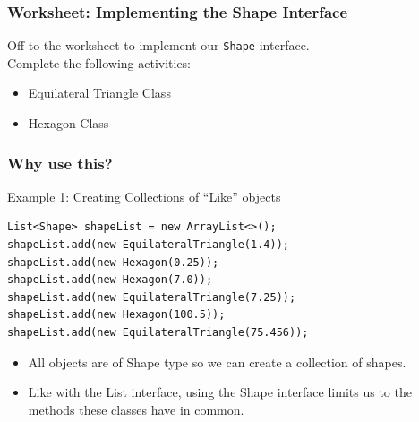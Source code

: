 \documentclass{beamer}
\begin{document}
\begin{frame}
    \frametitle{Worksheet: Implementing the Shape Interface}
    \begin{figure}
        \centering
        \hspace{2.5cm}
    \end{figure}
    Off to the worksheet to implement our \lstinline|Shape| interface.\\
    Complete the following activities:
    \begin{itemize}
        \item Equilateral Triangle Class
        \item Hexagon Class
    \end{itemize}
\end{frame}

\begin{frame}[fragile]
    \frametitle{Why use this?}
    Example 1: Creating Collections of ``Like'' objects
    \vfill
    \begin{lstlisting}
List<Shape> shapeList = new ArrayList<>();
shapeList.add(new EquilateralTriangle(1.4));
shapeList.add(new Hexagon(0.25));
shapeList.add(new Hexagon(7.0));
shapeList.add(new EquilateralTriangle(7.25));
shapeList.add(new Hexagon(100.5));
shapeList.add(new EquilateralTriangle(75.456));
    \end{lstlisting}
    \begin{itemize}
        \item All objects are of Shape type so we can create a collection of shapes.
            
        \item Like with the List interface, using the Shape interface limits us to the methods these classes have in common.
    \end{itemize}
\end{frame}
\end{document}
